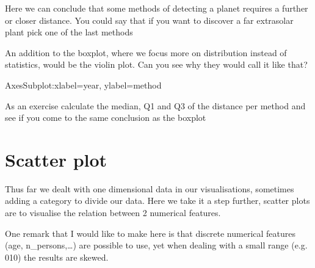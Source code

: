 \documentclass[letterpaper,10pt,english]{jupyterBook}
\begin{document}
\sphinxAtStartPar
Here we can conclude that some methods of detecting a planet requires a further or closer distance.
You could say that if you want to discover a far extrasolar plant pick one of the last methods

\sphinxAtStartPar
An addition to the boxplot, where we focus more on distribution instead of statistics, would be the violin plot.
Can you see why they would call it like that?

\begin{sphinxVerbatim}[commandchars=\\\{\}]
  
\end{sphinxVerbatim}

\begin{sphinxVerbatim}[commandchars=\\\{\}]
\PYGZlt{}AxesSubplot:xlabel=\PYGZsq{}year\PYGZsq{}, ylabel=\PYGZsq{}method\PYGZsq{}\PYGZgt{}
\end{sphinxVerbatim}

\noindent{}

\sphinxAtStartPar
As an exercise calculate the median, Q1 and Q3 of the distance per method and see if you come to the same conclusion as the boxplot


\chapter{Scatter plot}
\label{\detokenize{c4_data_visualisation/scatter:scatter-plot}}\label{\detokenize{c4_data_visualisation/scatter::doc}}
\sphinxAtStartPar
Thus far we dealt with one dimensional data in our visualisations, sometimes adding a category to divide our data.
Here we take it a step further, scatter plots are to visualise the relation between 2 numerical features.

\sphinxAtStartPar
One remark that I would like to make here is that discrete numerical features (age, n\_persons,…) are possible to use, yet when dealing with a small range (e.g. 0\sphinxhyphen{}10) the results are skewed.

\begin{sphinxVerbatim}[commandchars=\\\{\}]
   
   
\end{sphinxVerbatim}
\end{document}

